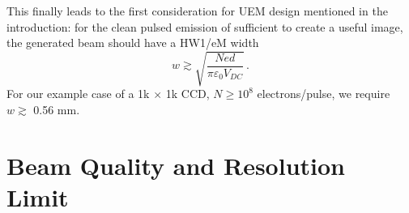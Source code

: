 This finally leads to the first consideration for UEM design mentioned in the introduction: for the clean pulsed emission of sufficient to create a useful image, the generated beam should have a HW1/eM width 
\begin{equation}
  w \gtrsim \sqrt{\frac{N e d}{\pi \varepsilon_0 V_{DC}}} \,\text{.}
\end{equation}
For our example case of a 1k $\times$ 1k CCD, $N \ge 10^8$ electrons/pulse, we require $w \gtrsim $ 0.56 mm.

\section{Beam Quality and Resolution Limit}


